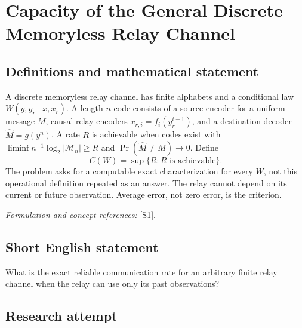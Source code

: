 \documentclass[11pt,a4paper]{article}
\newcommand{\sref}[2]{\hyperlink{source:#1:#2}{[S#2]}}
\newif\ifshowcatalogue
\newcommand{\cataloguescope}[1]{\ifshowcatalogue
 \paragraph{Exact scope in the supplied catalogue.}
 \begin{quote}\small #1\end{quote}\fi}
\numberwithin{equation}{section}
\begin{document}
\setcounter{section}{166}
\clearpage
\section{\texorpdfstring{Capacity of the General Discrete Memoryless Relay Channel}{Capacity of the General Discrete Memoryless Relay Channel}}\label{167}
\subsection{Definitions and mathematical statement}
A discrete memoryless relay channel has finite alphabets and a conditional law $W(y,y_r\mid x,x_r)$. A length-$n$ code consists of a source encoder for a uniform message $M$, causal relay encoders $x_{r,i}=f_i(y_r^{i-1})$, and a destination decoder $\widehat M=g(y^n)$. A rate $R$ is achievable when codes exist with $\liminf n^{-1}\log_2|\mathcal M_n|\ge R$ and $\Pr(\widehat M\ne M)\to0$. Define
\[
 C(W)=\sup\{R:R\text{ is achievable}
 \}.
\]
The problem asks for a computable exact characterization for every $W$, not this operational definition repeated as an answer. The relay cannot depend on its current or future observation. Average error, not zero error, is the criterion.
\par\smallskip\textit{Formulation and concept references:} \sref{167}{1}.
\cataloguescope{Find a computable exact average-error Shannon-capacity characterization for every finite-alphabet discrete memoryless relay channel with law p(y,y\_r|x,x\_r), where the relay input at time i depends only on its observations before time i.}
\subsection{Short English statement}
What is the exact reliable communication rate for an arbitrary finite relay channel when the relay can use only its past observations?
\subsection{Research attempt}
\end{document}
